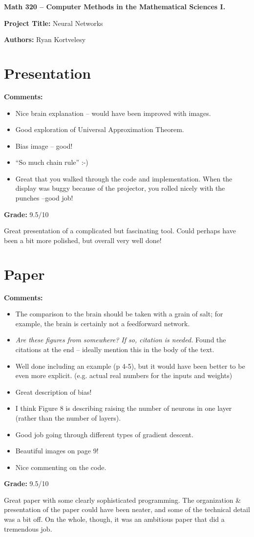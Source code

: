 \documentclass[12pt]{article}
\begin{document}
{\bf \large Math 320 -- Computer Methods in the Mathematical Sciences I.}\\

\vspace{3mm}

{\bf \large Project Title:} Neural Networks\\
\vspace{2mm}

{\bf \large Authors:} Ryan Kortvelesy\\

\vspace{3mm}

\section{Presentation}
{\bf \large Comments:}
\begin{itemize}
\item Nice brain explanation -- would have been improved with images.
\item Good exploration of Universal Approximation Theorem.
\item Bias image -- good!
\item ``So much chain rule'' :-)
\item Great that you walked through the code and implementation. When the
display was buggy because of the projector, you rolled nicely with the punches --good job!
\end{itemize}

{\bf \large Grade:} 9.5/10

Great presentation of a complicated but fascinating tool. 
Could perhaps have been a bit more polished, but overall very well done!


\section{Paper}

{\bf \large Comments:}
\begin{itemize}
\item The comparison to the brain should be taken with a grain of salt;
for example, the brain is certainly not a feedforward network.
\item \textit{Are these figures from somewhere? If so, citation is needed.} Found the citations at the end -- ideally mention this in the body of the text.
\item Well done including an example (p 4-5), but it would have been
better to be even more explicit. (e.g. actual real numbers for 
the inputs and weights)
\item Great description of bias!
\item I think Figure 8 is describing raising the number of neurons in
one layer (rather than the number of layers).
\item Good job going through different types of gradient descent.
\item Beautiful images on page 9!
\item Nice commenting on the code.
\end{itemize}

{\bf \large Grade:} 9.5/10

Great paper with some clearly sophisticated programming.
The organization \& presentation of the paper could have been neater, and
some of the technical detail was a bit off. On the whole, though, it was
an ambitious paper that did a tremendous job.
\end{document}
